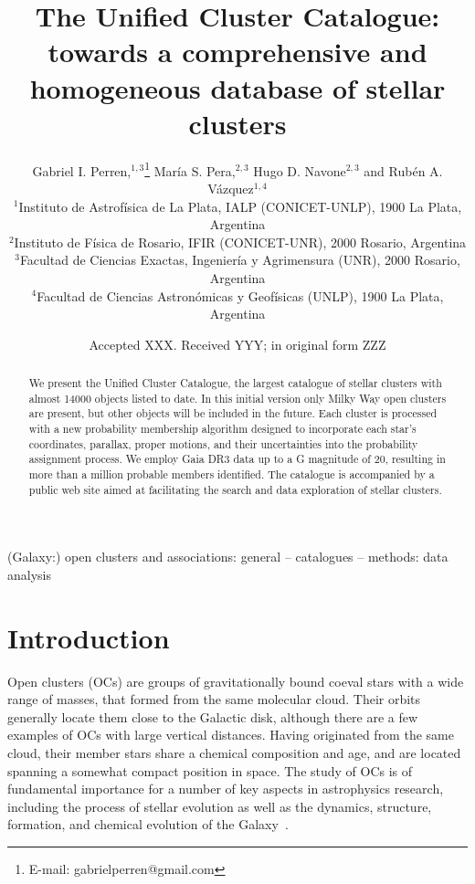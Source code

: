 \documentclass[fleqn,usenatbib]{mnras}
\title[The Unified Cluster Catalogue]{The Unified Cluster Catalogue: towards a
comprehensive and homogeneous database of stellar clusters}
\author[G. I. Perren et al.]{
Gabriel I. Perren,$^{1,3}$\thanks{E-mail: gabrielperren@gmail.com}
Mar\'ia S. Pera,$^{2,3}$
Hugo D. Navone$^{2,3}$
and Rub\'en A. V\'azquez$^{1,4}$
\\
$^{1}$Instituto de Astrof\'isica de La Plata, IALP (CONICET-UNLP), 1900 La Plata, Argentina\\
$^{2}$Instituto de F\'isica de Rosario, IFIR (CONICET-UNR), 2000 Rosario, Argentina\\
$^{3}$Facultad de Ciencias Exactas, Ingenier\'ia y Agrimensura (UNR), 2000 Rosario, Argentina\\
$^{4}$Facultad de Ciencias Astron\'omicas y Geof\'isicas (UNLP), 1900 La Plata, Argentina
}
\date{Accepted XXX. Received YYY; in original form ZZZ}
\begin{document}
\label{firstpage}
\pagerange{\pageref{firstpage}--\pageref{lastpage}}
\maketitle

\begin{abstract}
We present the Unified Cluster Catalogue, the largest catalogue of stellar
clusters with almost 14000 objects listed to date. In this initial
version only Milky Way open clusters are present, but other objects will be
included in the future. Each cluster is processed with a new probability
membership algorithm designed to incorporate each star's coordinates, parallax,
proper motions, and their uncertainties into the probability assignment process.
We employ Gaia DR3 data up to a G magnitude of 20, resulting in more than a
million probable members identified. The catalogue is accompanied by a public
web site aimed at facilitating the search and data exploration of stellar
clusters.
\end{abstract}

\begin{keywords}
(Galaxy:) open clusters and associations: general --
catalogues -- methods: data analysis
\end{keywords}



\section{Introduction}

Open clusters (OCs) are groups of gravitationally bound coeval stars
with a wide range of masses, that formed from the same molecular cloud.
Their orbits generally locate them close to the Galactic disk, although there
are a few examples of OCs with large vertical distances. Having originated from
the same cloud, their member stars share a chemical composition and age, and are
located spanning a somewhat compact position in space.
The study of OCs is of fundamental importance for a number of key aspects in
astrophysics research, including the process of stellar evolution as well as the
dynamics, structure, formation, and chemical evolution of the
Galaxy~\citep{Friel1995}.
\end{document}
